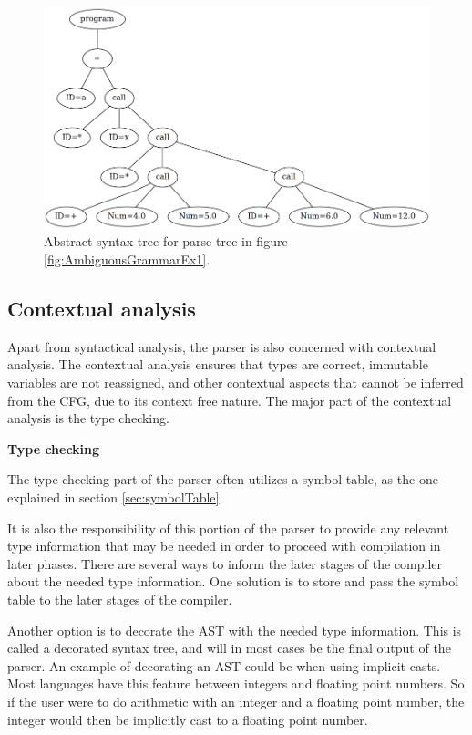 \begin{figure}[H]
	\centering
	\includegraphics[width=\textwidth*5/6]{3.Theory/images/ast.png}
	\caption{
		Abstract syntax tree for parse tree in figure \ref{fig:AmbiguousGrammarEx1}.
	}
	\label{fig:ast}
\end{figure}

\subsection{Contextual analysis}

Apart from syntactical analysis, the parser is also concerned with contextual analysis. 
The contextual analysis ensures that types are correct, immutable variables are not reassigned, and other contextual aspects that cannot be inferred from the CFG, due to its context free nature. 
The major part of the contextual analysis is the type checking.

\textbf{Type checking}

The type checking part of the parser often utilizes a symbol table, as the one explained in section \ref{sec:symbolTable}.

It is also the responsibility of this portion of the parser to provide any relevant type information that may be needed in order to proceed with compilation in later phases. 
There are several ways to inform the later stages of the compiler about the needed type information. 
One solution is to store and pass the symbol table to the later stages of the compiler. 

Another option is to decorate the AST with the needed type information. 
This is called a decorated syntax tree, and will in most cases be the final output of the parser.
An example of decorating an AST could be when using implicit casts. 
Most languages have this feature between integers and floating point numbers. 
So if the user were to do arithmetic with an integer and a floating point number, the integer would then be implicitly cast to a floating point number.

